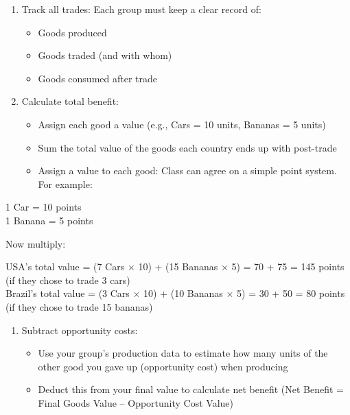 \documentclass[
  11pt,
]{article}
\providecommand{\tightlist}{%
  \setlength{\itemsep}{0pt}\setlength{\parskip}{0pt}}
\begin{document}
\begin{enumerate}
\def\labelenumi{\arabic{enumi}.}
\tightlist
\item
  Track all trades: Each group must keep a clear record of:

  \begin{itemize}
  \tightlist
  \item
    Goods produced
  \item
    Goods traded (and with whom)
  \item
    Goods consumed after trade
  \end{itemize}
\item
  Calculate total benefit:

  \begin{itemize}
  \tightlist
  \item
    Assign each good a value (e.g., Cars = 10 units, Bananas = 5 units)
  \item
    Sum the total value of the goods each country ends up with
    post-trade
  \item
    Assign a value to each good: Class can agree on a simple point
    system. For example:
  \end{itemize}
\end{enumerate}

1 Car = 10 points\\
1 Banana = 5 points

Now multiply:

USA's total value = (7 Cars × 10) + (15 Bananas × 5) = 70 + 75 = 145
points (if they chose to trade 3 cars)\\
Brazil's total value = (3 Cars × 10) + (10 Bananas × 5) = 30 + 50 = 80
points (if they chose to trade 15 bananas)

\begin{enumerate}
\def\labelenumi{\arabic{enumi}.}
\setcounter{enumi}{2}
\tightlist
\item
  Subtract opportunity costs:

  \begin{itemize}
  \tightlist
  \item
    Use your group's production data to estimate how many units of the
    other good you gave up (opportunity cost) when producing
  \item
    Deduct this from your final value to calculate net benefit (Net
    Benefit = Final Goods Value -- Opportunity Cost Value)
  \end{itemize}
\end{enumerate}
\end{document}

